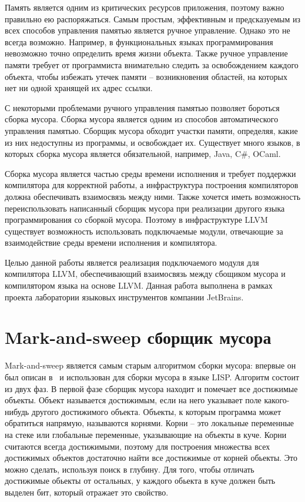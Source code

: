 Память является одним из критических ресурсов приложения, поэтому важно правильно ею распоряжаться. 
Самым простым, эффективным и предсказуемым из всех способов управления памятью является ручное управление. 
Однако это не всегда возможно. Например, в функциональных языках программирования невозможно точно
определить время жизни объекта. Также ручное управление памяти требует от программиста внимательно следить
за освобождением каждого объекта, чтобы избежать утечек памяти -- возникновения областей, на которых нет ни одной 
хранящей их адрес ссылки.

С некоторыми проблемами ручного управления памятью позволяет бороться сборка мусора. 
Сборка мусора является одним из способов автоматического управления памятью. Сборщик мусора обходит участки памяти, определяя, 
какие из них недоступны из программы, и освобождает их. Существует много языков, в которых сборка мусора является обязательной,
например, Java, C\#, OCaml. 

Сборка мусора является частью среды времени исполнения и требует поддержки компилятора для корректной работы, а инфраструктура построения компиляторов должна обеспечивать взаимосвязь между ними. Также хочется иметь возможность переиспользовать написанный сборщик мусора при реализации другого языка программирования со сборкой мусора. Поэтому в инфраструктуре LLVM  существует возможность использовать подключаемые модули, отвечающие за взаимодействие среды времени исполнения и компилятора. 

Целью данной работы является реализация подключаемого модуля для компилятора LLVM, обеспечивающий взаимосвязь между 
сбощиком мусора и компилятором языка на основе LLVM.
Данная работа выполнена в рамках проекта лаборатории языковых инструментов компании JetBrains.

\section{Mark-and-sweep сборщик мусора}
Mark-and-sweep является самым старым алгоритмом сборки мусора: впервые он был описан в~\cite{lisp} и использован для сборки мусора в языке LISP. 
Алгоритм состоит из двух фаз. В первой фазе сборщик мусора находит и помечает все достижимые объекты. Объект называется достижимым, если на него указывает поле какого-нибудь другого достижимого объекта. Объекты, к которым программа может обратиться напрямую, называются корнями. Корни -- это локальные переменные на стеке или глобальные переменные, указывающие на объекты в куче. Корни считаются всегда достижимыми, поэтому для построения множества всех достижимых объектов достаточно найти все достижимые от корней обьекты. Это можно сделать, используя поиск в глубину. Для того, чтобы отличать достижимые обьекты от остальных, у каждого обьекта в куче должен быть выделен бит, который отражает это свойство.

